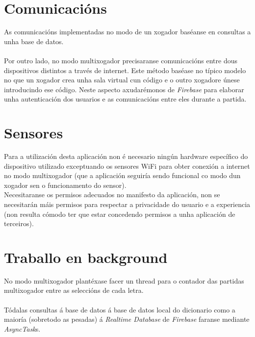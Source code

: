 \section {Comunicacións}
As comunicacións implementadas no modo de un xogador baséanse en consultas a unha base de datos. \\
\\
Por outro lado, no modo multixogador precisaranse comunicacións entre dous dispositivos distintos a través de internet. Este método baséase no típico modelo no que un xogador crea unha sala virtual cun código e o outro xogadore únese introducindo ese código. Neste aspecto axudarémonos de \textit{Firebase} para elaborar unha autenticación dos usuarios e as comunicacións entre eles durante a partida. 
\\ \section {Sensores}
Para a utilización desta aplicación non é necesario ningún hardware específico do dispositivo utilizado exceptuando os sensores WiFi para obter conexión a internet no modo multixogador (que a aplicación seguiría sendo funcional co modo dun xogador sen o funcionamento do sensor).\\
Necesitaranse os permisos adecuados no manifesto da aplicación, non se necesitarán máis permisos para respectar a privacidade do usuario e a experiencia (non resulta cómodo ter que estar concedendo permisos a unha aplicación de terceiros). 

\section {Traballo en background} 
No modo multixogador plantéxase facer un thread  para o contador das partidas multixogador entre as seleccións de cada letra. \\
\\
Tódalas consultas á base de datos á base de datos local do dicionario como a maioría (sobretodo as pesadas) á \textit{Realtime Database} de \textit{Firebase} faranse mediante \textit{AsyncTask}s.